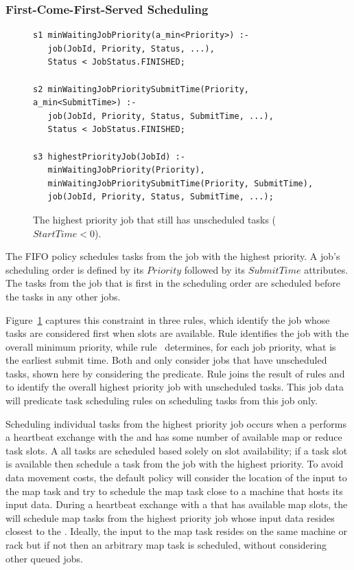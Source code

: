 \subsubsection{First-Come-First-Served Scheduling}

\begin{figure}
\label{fig:joborder}
\ssp
\centering
\begin{lstlisting}
s1 minWaitingJobPriority(a_min<Priority>) :-
   job(JobId, Priority, Status, ...),
   Status < JobStatus.FINISHED;
	
s2 minWaitingJobPrioritySubmitTime(Priority, a_min<SubmitTime>) :-
   job(JobId, Priority, Status, SubmitTime, ...),
   Status < JobStatus.FINISHED;

s3 highestPriorityJob(JobId) :-
   minWaitingJobPriority(Priority),
   minWaitingJobPrioritySubmitTime(Priority, SubmitTime),
   job(JobId, Priority, Status, SubmitTime, ...);
\end{lstlisting}
\caption{\label{ch:boom:fig:joborder}The highest priority job that still has unscheduled tasks ($StartTime < 0$).}
\end{figure}

The FIFO policy schedules tasks from the job with the highest priority.  A
job's scheduling order is defined by its $Priority$ followed by its
$SubmitTime$ attributes.  The tasks from the job that is first in the
scheduling order are scheduled before the tasks in any other jobs.

Figure~\ref{ch:boom:fig:joborder} captures this constraint in three rules,
which identify the job whose tasks are considered first when \TT slots are
available.  Rule  identifies the job with the overall minimum priority,
while rule~ determines, for each job priority, what is the earliest
submit time.  Both  and  only consider jobs that have unscheduled
tasks, shown here by considering the 
predicate.  Rule  joins the result of rules  and  to
identify the overall highest priority job with unscheduled tasks.  This job
data will predicate task scheduling rules on scheduling tasks from this job
only.

Scheduling individual tasks from the highest priority job occurs when a \TT
performs a heartbeat exchange with the \JT and has some number of available map
or reduce task slots.  A all tasks are scheduled based solely on slot
availability; if a task slot is available then schedule a task from the job
with the highest priority.  To avoid data movement costs, the default policy
will consider the location of the input to the map task and try to schedule the
map task close to a machine that hosts its input data.  During a heartbeat
exchange with a \TT that has available map slots, the \JT will schedule map
tasks from the highest priority job whose input data resides closest to the
\TT.  Ideally, the input to the map task resides on the same machine or rack
but if not then an arbitrary map task is scheduled, without considering other
queued jobs.

